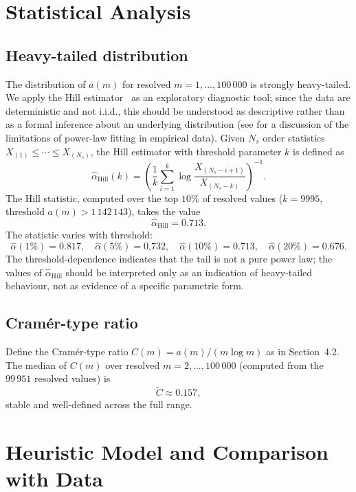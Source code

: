 \documentclass[12pt]{article}
\begin{document}
	\section{Statistical Analysis}
	
	\subsection{Heavy-tailed distribution}
	
	The distribution of $a(m)$ for resolved $m = 1, \ldots, 100\,000$ is
	strongly heavy-tailed.
	We apply the Hill estimator~\cite{Hill1975} as an exploratory
	diagnostic tool; since the data are deterministic and not i.i.d.,
	this should be understood as descriptive rather than as a formal
	inference about an underlying distribution (see \cite{Clauset2009}
	for a discussion of the limitations of power-law fitting in empirical
	data).
	Given $N_s$ order statistics $X_{(1)} \leq \cdots \leq X_{(N_s)}$, the
	Hill estimator with threshold parameter $k$ is defined as
	\[
	\hat{\alpha}_{\mathrm{Hill}}(k)
	= \left(
	\frac{1}{k} \sum_{i=1}^{k}
	\log \frac{X_{(N_s-i+1)}}{X_{(N_s-k)}}
	\right)^{-1}.
	\]
	The Hill statistic, computed over the top $10\%$ of resolved values
	($k = 9995$, threshold $a(m) > 1\,142\,143$), takes the value
	\[
	\hat{\alpha}_{\mathrm{Hill}} = 0.713.
	\]
	The statistic varies with threshold:
	\[
	\hat{\alpha}(1\%) = 0.817, \quad
	\hat{\alpha}(5\%) = 0.732, \quad
	\hat{\alpha}(10\%) = 0.713, \quad
	\hat{\alpha}(20\%) = 0.676.
	\]
	The threshold-dependence indicates that the tail is not a pure power
	law; the values of $\hat{\alpha}_{\mathrm{Hill}}$ should be interpreted
	only as an indication of heavy-tailed behaviour, not as evidence of a
	specific parametric form.
	
	\subsection{Cram\'er-type ratio}
	
	Define the Cram\'er-type ratio $C(m) = a(m)/(m \log m)$ as in
	Section~4.2.
	The median of $C(m)$ over resolved $m = 2, \ldots, 100\,000$
	(computed from the $99\,951$ resolved values) is
	\[
	\widetilde{C} \approx 0.157,
	\]
	stable and well-defined across the full range.
	
	\section{Heuristic Model and Comparison with Data}
	\label{sec:heuristic}
	
\end{document}
